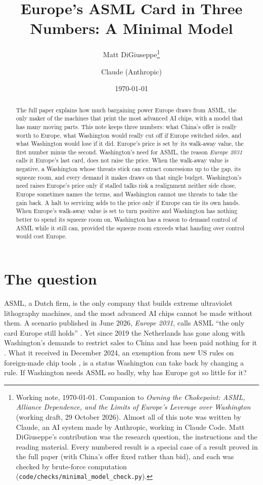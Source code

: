 \documentclass[11pt]{article}
\title{Europe's ASML Card in Three Numbers: A Minimal Model}
\author{Matt DiGiuseppe\thanks{Working note, \today. Companion to \emph{Owning the Chokepoint: ASML, Alliance Dependence, and the Limits of Europe's Leverage over Washington} (working draft, 29 October 2026). Almost all of this note was written by Claude, an AI system made by Anthropic, working in Claude Code. Matt DiGiuseppe's contribution was the research question, the instructions and the reading material. Every numbered result is a special case of a result proved in the full paper (with China's offer fixed rather than bid), and each was checked by brute-force computation (\texttt{code/checks/minimal\_model\_check.py}).} \and Claude (Anthropic)}
\date{\today}
\begin{document}
\maketitle

\begin{abstract}
\noindent The full paper explains how much bargaining power Europe draws from ASML, the only maker of the machines that print the most advanced AI chips, with a model that has many moving parts. This note keeps three numbers: what China's offer is really worth to Europe, what Washington would really cut off if Europe switched sides, and what Washington would lose if it did. Europe's price is set by its walk-away value, the first number minus the second. Washington's need for ASML, the reason \emph{Europe 2031} calls it Europe's last card, does not raise the price. When the walk-away value is negative, a Washington whose threats stick can extract concessions up to the gap, its squeeze room, and every demand it makes draws on that single budget. Washington's need raises Europe's price only if stalled talks risk a realignment neither side chose, Europe sometimes names the terms, and Washington cannot use threats to take the gain back. A halt to servicing adds to the price only if Europe can tie its own hands. When Europe's walk-away value is set to turn positive and Washington has nothing better to spend its squeeze room on, Washington has a reason to demand control of ASML while it still can, provided the squeeze room exceeds what handing over control would cost Europe.
\end{abstract}

\section{The question}

ASML, a Dutch firm, is the only company that builds extreme ultraviolet lithography machines, and the most advanced AI chips cannot be made without them. A scenario published in June 2026, \emph{Europe 2031}, calls ASML ``the only card Europe still holds'' \citep{juijn2026europe}. Yet since 2019 the Netherlands has gone along with Washington's demands to restrict sales to China and has been paid nothing for it \citep{nltimes2020pressured, govnl2023controls}. What it received in December 2024, an exemption from new US rules on foreign-made chip tools \citep{bis2024fdpr}, is a status Washington can take back by changing a rule. If Washington needs ASML so badly, why has Europe got so little for it?
\end{document}
